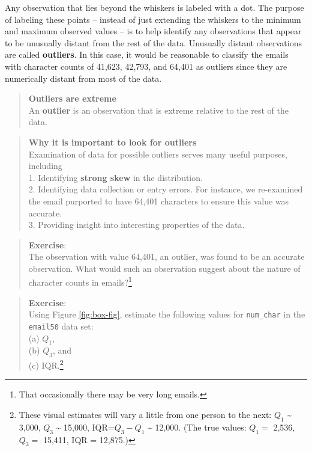 \documentclass[
]{book}
\begin{document}
Any observation that lies beyond the whiskers is labeled with a dot. The purpose of labeling these points -- instead of just extending the whiskers to the minimum and maximum observed values -- is to help identify any observations that appear to be unusually distant from the rest of the data. Unusually distant observations are called \textbf{outliers}. In this case, it would be reasonable to classify the emails with character counts of 41,623, 42,793, and 64,401 as outliers since they are numerically distant from most of the data.

\begin{quote}
\textbf{Outliers are extreme}\\
An \textbf{outlier} is an observation that is extreme relative to the rest of the data.
\end{quote}

\begin{quote}
\textbf{Why it is important to look for outliers}\\
Examination of data for possible outliers serves many useful purposes, including\\
1. Identifying \textbf{strong skew} in the distribution.\\
2. Identifying data collection or entry errors. For instance, we re-examined the email purported to have 64,401 characters to ensure this value was accurate.\\
3. Providing insight into interesting properties of the data.
\end{quote}

\begin{quote}
\textbf{Exercise}:\\
The observation with value 64,401, an outlier, was found to be an accurate observation. What would such an observation suggest about the nature of character counts in emails?\footnote{That occasionally there may be very long emails.}
\end{quote}

\begin{quote}
\textbf{Exercise}:\\
Using Figure \ref{fig:box-fig}, estimate the following values for \texttt{num\_char} in the \texttt{email50} data set:\\
(a) \(Q_1\),\\
(b) \(Q_3\), and\\
(c) IQR.\footnote{These visual estimates will vary a little from one person to the next: \(Q_1\) \textasciitilde{} 3,000, \(Q_3\) \textasciitilde{} 15,000, IQR=\(Q_3 - Q_1\) \textasciitilde{} 12,000. (The true values: \(Q_1=\) 2,536, \(Q_3=\) 15,411, IQR = 12,875.)}
\end{quote}
\end{document}
